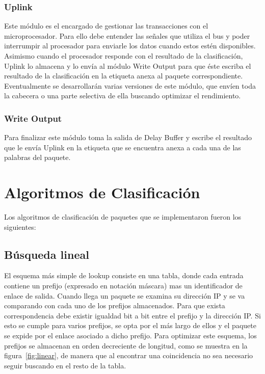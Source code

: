 \subsubsection{Uplink}
Este módulo es el encargado de gestionar las transacciones con el microprocesador. Para ello debe entender las señales que utiliza el bus y poder interrumpir al procesador para enviarle los datos cuando estos estén disponibles. Asimismo cuando el procesador responde con el resultado de la clasificación, Uplink lo almacena y lo envía al módulo Write Output para que éste escriba el resultado de la clasificación en la etiqueta anexa al paquete correspondiente.
Eventualmente se desarrollarán varias versiones de este módulo, que envíen toda la cabecera o una parte selectiva de ella buscando optimizar el rendimiento.

\subsubsection{Write Output}
Para finalizar este módulo toma la salida de Delay Buffer y escribe el resultado que le envía Uplink en la etiqueta que se encuentra anexa a cada una de las palabras del paquete.

\section{Algoritmos de Clasificación}

Los algoritmos de clasificación de paquetes que se implementaron fueron los siguientes:

\subsection{Búsqueda lineal}

El esquema más simple de lookup consiste en una tabla, donde cada entrada contiene un prefijo (expresado en notación máscara) mas un identificador de enlace de salida. Cuando llega un paquete se examina su dirección IP y se va comparando con cada uno de los prefijos almacenados. Para que exista correspondencia debe existir igualdad bit a bit entre el prefijo y la dirección IP. Si esto se cumple para varios prefijos, se opta por el más largo de ellos y el paquete se expide por el enlace asociado a dicho prefijo.
Para optimizar este esquema, los prefijos se almacenan en orden decreciente de longitud, como se muestra en la figura~\ref{fig:linear}, de manera que al encontrar una coincidencia no sea necesario seguir buscando en el resto de la tabla. 

